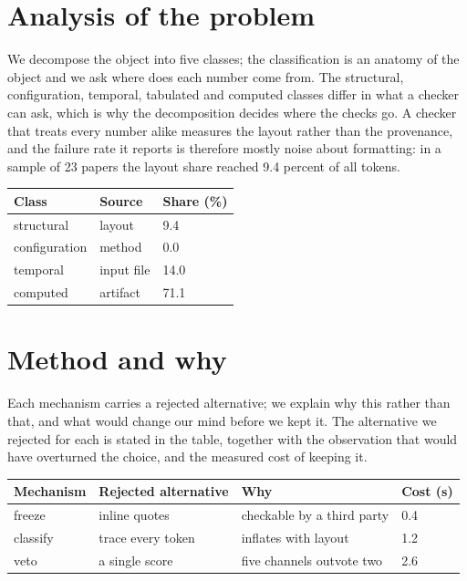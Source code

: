 

\section{Analysis of the problem}
We decompose the object into five classes; the classification is an anatomy of
the object and we ask where does each number come from. The structural,
configuration, temporal, tabulated and computed classes differ in what a checker
can ask, which is why the decomposition decides where the checks go. A checker
that treats every number alike measures the layout rather than the provenance,
and the failure rate it reports is therefore mostly noise about formatting: in a
sample of 23 papers the layout share reached 9.4 percent of all tokens.

\begin{table}\centering
\begin{tabular}{@{}lll@{}}
\toprule
Class & Source & Share (\%) \\
\midrule
structural & layout & 9.4 \\
configuration & method & 0.0 \\
temporal & input file & 14.0 \\
computed & artifact & 71.1 \\
\bottomrule
\end{tabular}
\end{table}

\section{Method and why}
Each mechanism carries a rejected alternative; we explain why this rather than
that, and what would change our mind before we kept it. The alternative we
rejected for each is stated in the table, together with the observation that
would have overturned the choice, and the measured cost of keeping it.

\begin{table}\centering
\begin{tabular}{@{}llll@{}}
\toprule
Mechanism & Rejected alternative & Why & Cost (s) \\
\midrule
freeze & inline quotes & checkable by a third party & 0.4 \\
classify & trace every token & inflates with layout & 1.2 \\
veto & a single score & five channels outvote two & 2.6 \\
\bottomrule
\end{tabular}
\end{table}

